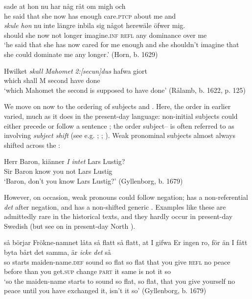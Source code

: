 \documentclass[output=paper]{langscibook}
\begin{document}
\ea\label{ex:intro:12}
\ea\label{ex:intro:12a}
\gll  [han] sade at     hon   nu   har     någ    råt     om   migh och \\
he   said   that she   now has   enough   care.\textsc{ptcp}   about   me     and\\

\gll  \textit{skule}   \textit{hon} nu   inte längre inbila       sig   något herewäle  öfwer   mig.\\
    should   she   now   not longer   imagine.\textsc{inf}   \textsc{refl}   any   dominance   over   me \\
\glt `he said that she has now cared for me enough and she shouldn’t imagine that she could dominate me any longer.’ (Horn, b. 1629)

\ex\label{ex:intro:12b}
\gll  Hwilket \textit{skall}   \textit{Mahomet} \textit{2:[secun]dus} hafwa   giort \\
      which   shall   M         second       have       done\\
    \glt ‘which Mahomet the second is supposed to have done’ (Rålamb, b. 1622, p. 125)
\z
\z

We move on now to the ordering of subjects and . Here, the order in earlier  varied, much as it does in the present-day language: non-initial subjects could either precede or follow a sentence ; the order subject– is often referred to as involving \textit{subject shift} (see e.g. \citealt{Holmberg1993}; \citealt{Svenonius2002}; \citealt{Andreasson2007}). Weak pronominal subjects almost always shifted across the :


\ea\label{ex:intro:13}
\gll  Herr Baron,   kiänner \textit{I} \textit{intet} Lars Lustig? \\
Sir      Baron  know    you not     Lars Lustig\\
\glt ‘Baron, don’t you know Lars Lustig?’ (Gyllenborg, b. 1679)
\z


However, on occasion, weak pronouns could follow negation;  has a non-referential \textit{det} after negation, and  has a non-shifted generic . Examples like these are admittedly rare in the historical texts, and they hardly occur in present-day Swedish (but see \citealt{Bentzen2014} on  in present-day North ).


\ea\label{ex:intro:14}
\ea\label{ex:intro:14a}
\gll  så börjar   Frökne-namnet     låta       så flatt så flatt,   at   I     gifwa   Er ingen ro,     för     än   I       fått       byta     bårt det samma, är \textit{icke} \textit{det} så\\
  so starts   maiden-name.\textsc{def}    sound   so flat   so flat   that you   give   \textsc{refl} no       peace   before than you   get\textsc{.sup} change \textsc{part}   it same is   not     it     so\\
\glt ‘so the maiden-name starts to sound so flat, so flat, that you give yourself no peace until you have exchanged it, isn’t it so’ (Gyllenborg, b. 1679)
\end{document}
